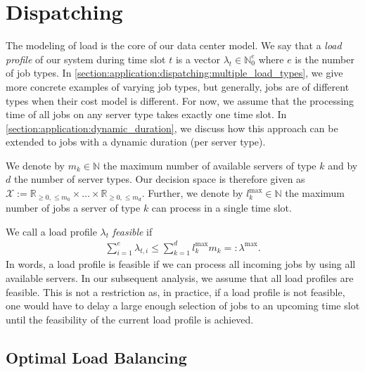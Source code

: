 \section{Dispatching}\label{section:application:dispatching}

The modeling of load is the core of our data center model. We say that a \emph{load profile} of our system during time slot $t$ is a vector $\lambda_t \in \mathbb{N}_0^e$ where $e$ is the number of job types. In \cref{section:application:dispatching:multiple_load_types}, we give more concrete examples of varying job types, but generally, jobs are of different types when their cost model is different. For now, we assume that the processing time of all jobs on any server type takes exactly one time slot. In \cref{section:application:dynamic_duration}, we discuss how this approach can be extended to jobs with a dynamic duration (per server type).

We denote by $m_k \in \mathbb{N}$ the maximum number of available servers of type $k$ and by $d$ the number of server types. Our decision space is therefore given as $\mathcal{X} := \mathbb{R}_{\geq 0, \leq m_0} \times \dots \times \mathbb{R}_{\geq 0, \leq m_d}$. Further, we denote by $l_k^{\text{max}} \in \mathbb{N}$ the maximum number of jobs a server of type $k$ can process in a single time slot.

We call a load profile $\lambda_t$ \emph{feasible} if \begin{align}
    \sum_{i=1}^e \lambda_{t,i} \leq \sum_{k=1}^d l_k^{\text{max}} m_k =: \lambda^{\text{max}}.
\label{eq:feasible_load_profiles}
\end{align} In words, a load profile is feasible if we can process all incoming jobs by using all available servers. In our subsequent analysis, we assume that all load profiles are feasible. This is not a restriction as, in practice, if a load profile is not feasible, one would have to delay a large enough selection of jobs to an upcoming time slot until the feasibility of the current load profile is achieved.

\subsection{Optimal Load Balancing}\label{section:application:dispatching:optimal_load_balancing}

